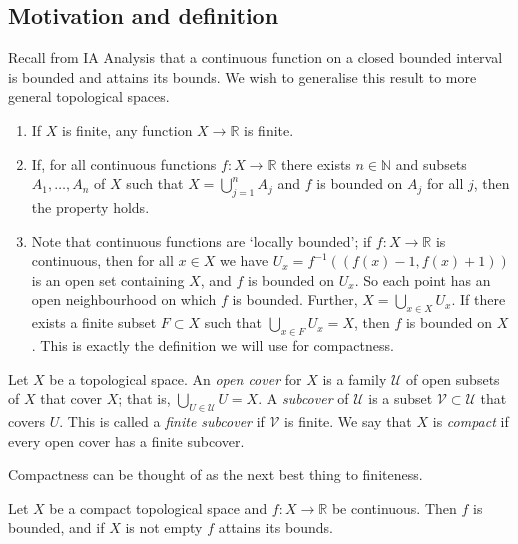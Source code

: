 \subsection{Motivation and definition}
Recall from IA Analysis that a continuous function on a closed bounded interval is bounded and attains its bounds.
We wish to generalise this result to more general topological spaces.
\begin{example}
	\begin{enumerate}
		\item If \( X \) is finite, any function \( X \to \mathbb R \) is finite.
		\item If, for all continuous functions \( f \colon X \to \mathbb R \) there exists \( n \in \mathbb N \) and subsets \( A_1, \dots, A_n \) of \( X \) such that \( X = \bigcup_{j=1}^n A_j \) and \( f \) is bounded on \( A_j \) for all \( j \), then the property holds.
		\item Note that continuous functions are `locally bounded'; if \( f \colon X \to \mathbb R \) is continuous, then for all \( x \in X \) we have \( U_x = f^{-1}((f(x)-1, f(x)+1)) \) is an open set containing \( X \), and \( f \) is bounded on \( U_x \).
		      So each point has an open neighbourhood on which \( f \) is bounded.
		      Further, \( X = \bigcup_{x \in X} U_x \).
		      If there exists a finite subset \( F \subset X \) such that \( \bigcup_{x \in F} U_x = X \), then \( f \) is bounded on \( X \).
		      This is exactly the definition we will use for compactness.
	\end{enumerate}
\end{example}
\begin{definition}
	Let \( X \) be a topological space.
	An \textit{open cover} for \( X \) is a family \( \mathcal U \) of open subsets of \( X \) that cover \( X \); that is, \( \bigcup_{U \in \mathcal U} U = X \).
	A \textit{subcover} of \( \mathcal U \) is a subset \( \mathcal V \subset \mathcal U \) that covers \( U \).
	This is called a \textit{finite subcover} if \( \mathcal V \) is finite.
	We say that \( X \) is \textit{compact} if every open cover has a finite subcover.
\end{definition}
\begin{remark}
	Compactness can be thought of as the next best thing to finiteness.
\end{remark}
\begin{theorem}
	Let \( X \) be a compact topological space and \( f \colon X \to \mathbb R \) be continuous.
	Then \( f \) is bounded, and if \( X \) is not empty \( f \) attains its bounds.
\end{theorem}
